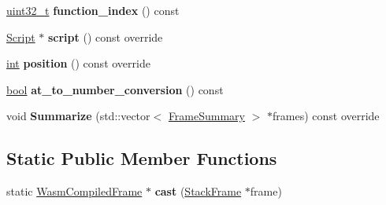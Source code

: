 \begin{DoxyCompactItemize}
\item 
\mbox{\label{classv8_1_1internal_1_1WasmCompiledFrame_a8f4d1d1b5d9f314972c8031bced0ad9c}} 
\mbox{\hyperlink{classuint32__t}{uint32\+\_\+t}} {\bfseries function\+\_\+index} () const
\item 
\mbox{\label{classv8_1_1internal_1_1WasmCompiledFrame_a56e1f612dc9f396f06a2a83488fdbc62}} 
\mbox{\hyperlink{classv8_1_1internal_1_1Script}{Script}} $\ast$ {\bfseries script} () const override
\item 
\mbox{\label{classv8_1_1internal_1_1WasmCompiledFrame_a9f9082911e5c518a5d2b6c6b9e21e7aa}} 
\mbox{\hyperlink{classint}{int}} {\bfseries position} () const override
\item 
\mbox{\label{classv8_1_1internal_1_1WasmCompiledFrame_a976dc10db155894ba25acc2b2eeb87c0}} 
\mbox{\hyperlink{classbool}{bool}} {\bfseries at\+\_\+to\+\_\+number\+\_\+conversion} () const
\item 
\mbox{\label{classv8_1_1internal_1_1WasmCompiledFrame_a789c3d88310c6531fb2b2f481739aa6f}} 
void {\bfseries Summarize} (std\+::vector$<$ \mbox{\hyperlink{classv8_1_1internal_1_1FrameSummary}{Frame\+Summary}} $>$ $\ast$frames) const override
\end{DoxyCompactItemize}
\subsection*{Static Public Member Functions}
\begin{DoxyCompactItemize}
\item 
\mbox{\label{classv8_1_1internal_1_1WasmCompiledFrame_ae2c3ed7ad0e5a04aff7c50dcd44093a6}} 
static \mbox{\hyperlink{classv8_1_1internal_1_1WasmCompiledFrame}{Wasm\+Compiled\+Frame}} $\ast$ {\bfseries cast} (\mbox{\hyperlink{classv8_1_1internal_1_1StackFrame}{Stack\+Frame}} $\ast$frame)
\end{DoxyCompactItemize}
